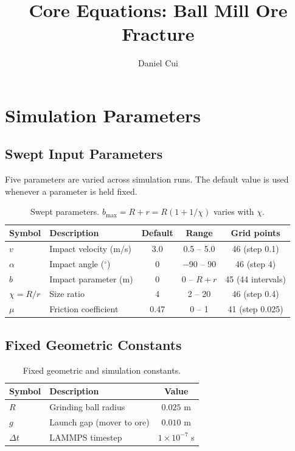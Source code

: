 \documentclass{article}
\title{Core Equations: Ball Mill Ore Fracture}
\author{Daniel Cui}
\date{}
\begin{document}
\maketitle

\section{Simulation Parameters}

\subsection{Swept Input Parameters}

Five parameters are varied across simulation runs.
The default value is used whenever a parameter is held fixed.

\begin{table}[h!]
\centering
\begin{tabular}{@{}llccc@{}}
\toprule
Symbol & Description & Default & Range & Grid points \\
\midrule
$v$           & Impact velocity (m/s)         & 3.0    & 0.5 -- 5.0      & 46 (step 0.1) \\
$\alpha$      & Impact angle ($^{\circ}$)     & 0      & $-90$ -- $90$   & 46 (step 4) \\
$b$           & Impact parameter (m)          & 0      & $0$ -- $R\!+\!r$ & 45 (44 intervals) \\
$\chi = R/r$  & Size ratio                    & 4      & 2 -- 20         & 46 (step 0.4) \\
$\mu$         & Friction coefficient          & 0.47   & 0 -- 1          & 41 (step 0.025) \\
\bottomrule
\end{tabular}
\caption{Swept parameters. $b_{\max} = R + r = R(1 + 1/\chi)$ varies with $\chi$.}
\end{table}

\subsection{Fixed Geometric Constants}

\begin{table}[h!]
\centering
\begin{tabular}{@{}llc@{}}
\toprule
Symbol & Description & Value \\
\midrule
$R$       & Grinding ball radius        & $0.025$ m \\
$g$       & Launch gap (mover to ore)   & $0.010$ m \\
$\Delta t$ & LAMMPS timestep            & $1\times10^{-7}$ s \\
\bottomrule
\end{tabular}
\caption{Fixed geometric and simulation constants.}
\end{table}
\end{document}
